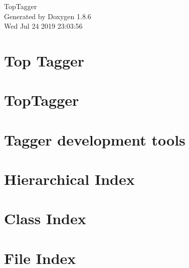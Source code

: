 \documentclass[twoside]{book}
\newcommand{\clearemptydoublepage}{%
  \newpage{\pagestyle{empty}\cleardoublepage}%
}
\begin{document}
\hypersetup{pageanchor=false}
\begin{titlepage}
\vspace*{7cm}
\begin{center}%
{\Large Top\-Tagger }\\
\vspace*{1cm}
{\large Generated by Doxygen 1.8.6}\\
\vspace*{0.5cm}
{\small Wed Jul 24 2019 23:03:56}\\
\end{center}
\end{titlepage}
\clearemptydoublepage
\tableofcontents
\clearemptydoublepage
{}
\hypersetup{pageanchor=true}

\chapter{Top Tagger}
\label{index}\hypertarget{index}{}
\chapter{Top\-Tagger}
\label{md__home_travis_build_susy2015_TopTagger_README}
\hypertarget{md__home_travis_build_susy2015_TopTagger_README}{}

\chapter{Tagger development tools}
\label{md__home_travis_build_susy2015_TopTagger_Tools_README}
\hypertarget{md__home_travis_build_susy2015_TopTagger_Tools_README}{}

\chapter{Hierarchical Index}

\chapter{Class Index}

\chapter{File Index}

\end{document}
